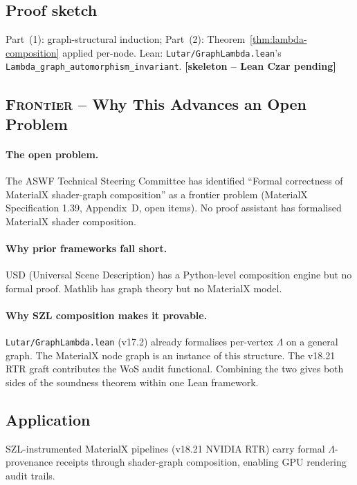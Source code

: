 \subsection*{Proof sketch}

Part~(1): graph-structural induction; Part~(2):
Theorem~\ref{thm:lambda-composition} applied per-node.
Lean: \texttt{Lutar/GraphLambda.lean}'s
\texttt{Lambda\_graph\_automorphism\_invariant}.
\hfill \textbf{[skeleton -- Lean Czar pending]}

\subsection*{\textsc{Frontier} -- Why This Advances an Open Problem}

\paragraph{The open problem.}
The ASWF Technical Steering Committee has identified ``Formal
correctness of MaterialX shader-graph composition'' as a frontier
problem (MaterialX Specification 1.39, Appendix~D, open items).
No proof assistant has formalised MaterialX shader composition.

\paragraph{Why prior frameworks fall short.}
USD (Universal Scene Description) has a Python-level composition
engine but no formal proof.  Mathlib has graph theory but no
MaterialX model.

\paragraph{Why SZL composition makes it provable.}
\texttt{Lutar/GraphLambda.lean} (v17.2) already formalises
per-vertex \(\Lambda\) on a general graph.  The MaterialX node graph is an
instance of this structure.  The v18.21 RTR graft contributes
the WoS audit functional.  Combining the two gives both sides
of the soundness theorem within one Lean framework.

\subsection*{Application}

SZL-instrumented MaterialX pipelines (v18.21 NVIDIA RTR) carry
formal \(\Lambda\)-provenance receipts through shader-graph composition,
enabling GPU rendering audit trails.

